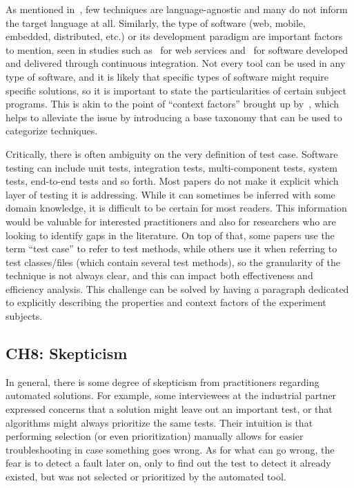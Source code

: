 As mentioned in~, few \rt techniques are language-agnostic and many do not inform the target language at all.
Similarly, the type of software (web, mobile, embedded, distributed, etc.) or its development paradigm are important factors to mention, seen in studies such as~ for web services and~ for software developed and delivered through continuous integration.
Not every tool can be used in any type of software, and it is likely that specific types of software might require specific solutions, so it is important to state the particularities of certain subject programs.
This is akin to the point of ``context factors'' brought up by~\citet{bin_ali_search_2019}, which helps to alleviate the issue by introducing a base taxonomy that can be used to categorize techniques.

Critically, there is often ambiguity on the very definition of test case.
Software testing can include unit tests, integration tests, multi-component tests, system tests, end-to-end tests and so forth.
Most papers do not make it explicit which layer of testing it is addressing. While it can sometimes be inferred with some domain knowledge, it is difficult to be certain for most readers.
This information would be valuable for interested practitioners and also for researchers who are looking to identify gaps in the literature.
On top of that, some papers use the term ``test case'' to refer to test methods, while others use it when referring to test classes/files (which contain several test methods), so the granularity of the technique is not always clear, and this can impact both effectiveness and efficiency analysis.
This challenge can be solved by having a paragraph dedicated to explicitly describing the properties and context factors of the experiment subjects.

\subsection{CH8: Skepticism}
In general, there is some degree of skepticism from practitioners regarding automated solutions.
For example, some interviewees at the industrial partner expressed concerns that a \tcs solution might leave out an important test, or that \tcp algorithms might always prioritize the same tests.
Their intuition is that performing selection (or even prioritization) manually allows for easier troubleshooting in case something goes wrong.
As for what can go wrong, the fear is to detect a fault later on, only to find out the test to detect it already existed, but was not selected or prioritized by the automated tool.

